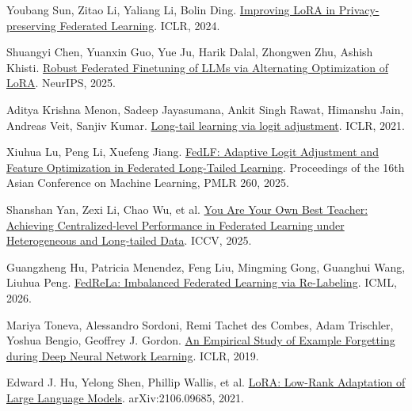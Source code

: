 \documentclass[UTF8,a4paper,10pt,fontset=fandol]{ctexart}
\begin{document}
{\small\noindent [7] Youbang Sun, Zitao Li, Yaliang Li, Bolin Ding. \href{https://proceedings.iclr.cc/paper_files/paper/2024/hash/4e243e95c913b367775d71d7182b99d9-Abstract-Conference.html}{Improving LoRA in Privacy-preserving Federated Learning}. ICLR, 2024.\par}

{\small\noindent [8] Shuangyi Chen, Yuanxin Guo, Yue Ju, Harik Dalal, Zhongwen Zhu, Ashish Khisti. \href{https://arxiv.org/abs/2502.01755}{Robust Federated Finetuning of LLMs via Alternating Optimization of LoRA}. NeurIPS, 2025.\par}

{\small\noindent [9] Aditya Krishna Menon, Sadeep Jayasumana, Ankit Singh Rawat, Himanshu Jain, Andreas Veit, Sanjiv Kumar. \href{https://openreview.net/pdf?id=37nvvqkCo5}{Long-tail learning via logit adjustment}. ICLR, 2021.\par}

{\small\noindent [10] Xiuhua Lu, Peng Li, Xuefeng Jiang. \href{https://proceedings.mlr.press/v260/lu25a.html}{FedLF: Adaptive Logit Adjustment and Feature Optimization in Federated Long-Tailed Learning}. Proceedings of the 16th Asian Conference on Machine Learning, PMLR 260, 2025.\par}

{\small\noindent [11] Shanshan Yan, Zexi Li, Chao Wu, et al. \href{https://openaccess.thecvf.com/content/ICCV2025/html/Yan_You_Are_Your_Own_Best_Teacher_Achieving_Centralized-level_Performance_in_ICCV_2025_paper.html}{You Are Your Own Best Teacher: Achieving Centralized-level Performance in Federated Learning under Heterogeneous and Long-tailed Data}. ICCV, 2025.\par}

{\small\noindent [12] Guangzheng Hu, Patricia Menendez, Feng Liu, Mingming Gong, Guanghui Wang, Liuhua Peng. \href{https://proceedings.mlr.press/v306/hu26ao.html}{FedReLa: Imbalanced Federated Learning via Re-Labeling}. ICML, 2026.\par}

{\small\noindent [13] Mariya Toneva, Alessandro Sordoni, Remi Tachet des Combes, Adam Trischler, Yoshua Bengio, Geoffrey J. Gordon. \href{https://arxiv.org/abs/1812.05159}{An Empirical Study of Example Forgetting during Deep Neural Network Learning}. ICLR, 2019.\par}

{\small\noindent [14] Edward J. Hu, Yelong Shen, Phillip Wallis, et al. \href{https://arxiv.org/abs/2106.09685}{LoRA: Low-Rank Adaptation of Large Language Models}. arXiv:2106.09685, 2021.\par}
\end{document}
